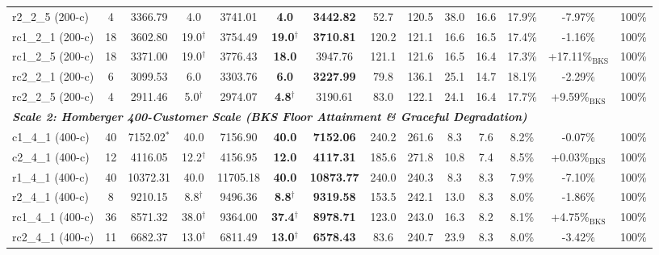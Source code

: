 \documentclass{ieeeaccess}
\begin{document}
\begin{table}[!t]
\begin{tabular*}{\textwidth}{@{\extracolsep{\fill}} l cc cc cc cc cc c c c @{}}
r2\_2\_5 (200-c) & 4 & 3366.79 & 4.0 & 3741.01 & \textbf{4.0} & \textbf{3442.82} & 52.7 & 120.5 & 38.0 & 16.6 & 17.9\% & -7.97\% & 100\% \\
rc1\_2\_1 (200-c) & 18 & 3602.80 & 19.0$^\dagger$ & 3754.49 & \textbf{19.0}$^\dagger$ & \textbf{3710.81} & 120.2 & 121.1 & 16.6 & 16.5 & 17.4\% & -1.16\% & 100\% \\
rc1\_2\_5 (200-c) & 18 & 3371.00 & 19.0$^\dagger$ & 3776.43 & \textbf{18.0} & 3947.76 & 121.1 & 121.6 & 16.5 & 16.4 & 17.3\% & +17.11\%$_{\text{BKS}}$ & 100\% \\
rc2\_2\_1 (200-c) & 6 & 3099.53 & 6.0 & 3303.76 & \textbf{6.0} & \textbf{3227.99} & 79.8 & 136.1 & 25.1 & 14.7 & 18.1\% & -2.29\% & 100\% \\
rc2\_2\_5 (200-c) & 4 & 2911.46 & 5.0$^\dagger$ & 2974.07 & \textbf{4.8}$^\dagger$ & 3190.61 & 83.0 & 122.1 & 24.1 & 16.4 & 17.7\% & +9.59\%$_{\text{BKS}}$ & 100\% \\
\midrule
\multicolumn{14}{l}{\textit{\textbf{Scale 2: Homberger 400-Customer Scale (BKS Floor Attainment \& Graceful Degradation)}}} \\
c1\_4\_1 (400-c) & 40 & 7152.02$^*$ & 40.0 & 7156.90 & \textbf{40.0} & \textbf{7152.06} & 240.2 & 261.6 & 8.3 & 7.6 & 8.2\% & -0.07\% & 100\% \\
c2\_4\_1 (400-c) & 12 & 4116.05 & 12.2$^\dagger$ & 4156.95 & \textbf{12.0} & \textbf{4117.31} & 185.6 & 271.8 & 10.8 & 7.4 & 8.5\% & +0.03\%$_{\text{BKS}}$ & 100\% \\
r1\_4\_1 (400-c) & 40 & 10372.31 & 40.0 & 11705.18 & \textbf{40.0} & \textbf{10873.77} & 240.0 & 240.3 & 8.3 & 8.3 & 7.9\% & -7.10\% & 100\% \\
r2\_4\_1 (400-c) & 8 & 9210.15 & 8.8$^\dagger$ & 9496.36 & \textbf{8.8}$^\dagger$ & \textbf{9319.58} & 153.5 & 242.1 & 13.0 & 8.3 & 8.0\% & -1.86\% & 100\% \\
rc1\_4\_1 (400-c) & 36 & 8571.32 & 38.0$^\dagger$ & 9364.00 & \textbf{37.4}$^\dagger$ & \textbf{8978.71} & 123.0 & 243.0 & 16.3 & 8.2 & 8.1\% & +4.75\%$_{\text{BKS}}$ & 100\% \\
rc2\_4\_1 (400-c) & 11 & 6682.37 & 13.0$^\dagger$ & 6811.49 & \textbf{13.0}$^\dagger$ & \textbf{6578.43} & 83.6 & 240.7 & 23.9 & 8.3 & 8.0\% & -3.42\% & 100\% \\
\bottomrule
\end{tabular*}

\end{table}
\end{document}
